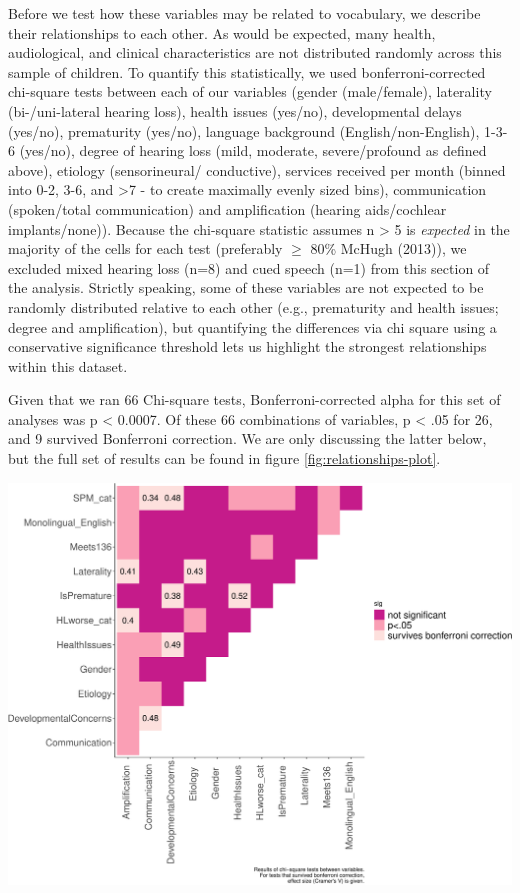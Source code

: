 \documentclass[english,man]{apa6}
\begin{document}
Before we test how these variables may be related to vocabulary, we describe their relationships to each other. As would be expected, many health, audiological, and clinical characteristics are not distributed randomly across this sample of children. To quantify this statistically, we used bonferroni-corrected chi-square tests between each of our variables (gender (male/female), laterality (bi-/uni-lateral hearing loss), health issues (yes/no), developmental delays (yes/no), prematurity (yes/no), language background (English/non-English), 1-3-6 (yes/no), degree of hearing loss (mild, moderate, severe/profound as defined above), etiology (sensorineural/ conductive), services received per month (binned into 0-2, 3-6, and \textgreater{}7 - to create maximally evenly sized bins), communication (spoken/total communication) and amplification (hearing aids/cochlear implants/none)). Because the chi-square statistic assumes n \textgreater{} 5 is \emph{expected} in the majority of the cells for each test (preferably \(\geq\) 80\% McHugh (2013)), we excluded mixed hearing loss (n=8) and cued speech (n=1) from this section of the analysis. Strictly speaking, some of these variables are not expected to be randomly distributed relative to each other (e.g., prematurity and health issues; degree and amplification), but quantifying the differences via chi square using a conservative significance threshold lets us highlight the strongest relationships within this dataset.

Given that we ran 66 Chi-square tests, Bonferroni-corrected alpha for this set of analyses was p \textless{} 0.0007. Of these 66 combinations of variables, p \textless{} .05 for 26, and 9 survived Bonferroni correction. We are only discussing the latter below, but the full set of results can be found in figure \ref{fig:relationships-plot}.

\includegraphics{ELSSP_paper_files/figure-latex/relationships-plot-1.pdf}
\end{document}
